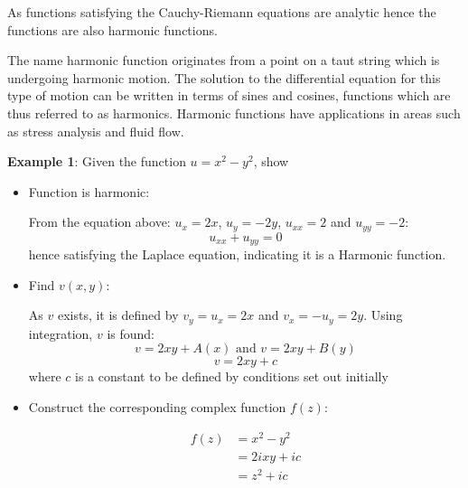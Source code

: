 \documentclass[10pt,a4paper]{article}
\begin{document}
As functions satisfying the Cauchy-Riemann equations are analytic hence the functions are also
harmonic functions. \par 
The name harmonic function originates from a point on a taut string which is undergoing harmonic
motion. The solution to the differential equation for this type of motion can be written in terms of
sines and cosines, functions which are thus referred to as harmonics. Harmonic functions have applications in areas such as stress analysis and fluid flow.

\textbf{Example 1}: Given the function $u=x^2 - y^2$, show 
\begin{itemize}
    \item Function is harmonic:
    
    From the equation above: $u_x = 2x$, $u_y=-2y$, $u_{xx}=2$ and $u_{yy}=-2$:
    $$u_{xx}+u_{yy}=0$$
    hence satisfying the Laplace equation, indicating it is a Harmonic function.

    \item Find $v(x,y)$:
    
    As $v$ exists, it is defined by $v_y=u_x=2x$ and $v_x=-u_y=2y$. Using integration, $v$ is found:
    \begin{equation*} 
    v=2xy+A(x) \textrm{   and   } v=2xy+B(y) 
    \end{equation*}
    \begin{equation*} 
    v=2xy+c
    \end{equation*}
    where $c$ is a constant to be defined by conditions set out initially

    \item Construct the corresponding complex function $f(z)$:
    
    \begin{equation*} 
        \begin{aligned}
            f(z)&=x^2-y^2 \\
            &= 2ixy + ic \\
            &= z^2 + ic 
        \end{aligned}
        \end{equation*}
\end{itemize}
\end{document}
